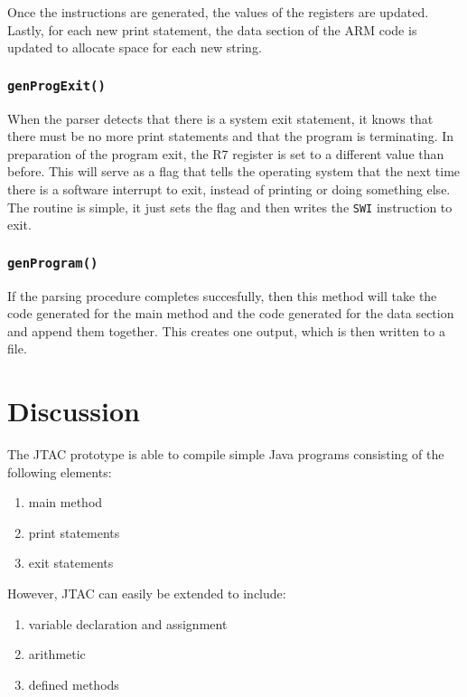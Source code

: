 \documentclass[11pt]{article}
\begin{document}
\bigskip
Once the instructions are generated, the values of the registers are updated. Lastly, for each new print statement, the data section of the ARM code is updated to allocate space for each new string.

\subsubsection{{\tt genProgExit()}}

When the parser detects that there is a system exit statement, it knows that there must be no more print statements and that the program is terminating. In preparation of the program exit, the R7 register is set to a different value than before. This will serve as a flag that tells the operating system that the next time there is a software interrupt to exit, instead of printing or doing something else. The routine is simple, it just sets the flag and then writes the {\tt SWI} instruction to exit. 

\subsubsection{\tt genProgram()}

If the parsing procedure completes succesfully, then this method will take the code generated for the main method and the code generated for the data section and append them together. This creates one output, which is then written to a file. 

\section{Discussion}

\justifying

The JTAC prototype is able to compile simple Java programs consisting of the following elements:

\begin{enumerate}[label=\alph*)]
	\item main method
	\item print statements
	\item exit statements
\end{enumerate}

However, JTAC can easily be extended to include:

\begin{enumerate}[label=\alph*)]
	\item variable declaration and assignment
	\item arithmetic
	\item defined methods
\end{enumerate}
\end{document}
